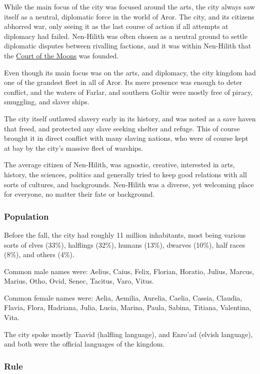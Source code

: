 While the main focus of the city was focused around the arts, the city always
saw itself as a neutral, diplomatic force in the world of Aror. The city, and
its citizens abhorred war, only seeing it as the last course of action if all
attempts at diplomacy had failed. Nen-Hilith was often chosen as a neutral
ground to settle diplomatic disputes between rivalling factions, and it was
within Nen-Hilith that the \hyperref[sec:Two Courts]{Court of the Moons} was
founded.

Even though its main focus was on the arts, and diplomacy, the city kingdom
had one of the grandest fleet in all of Aror. Its mere presence was enough to
deter conflict, and the waters of Farlar, and southern Goltir were mostly free
of piracy, smuggling, and slaver ships.

The city itself outlawed slavery early in its history, and was noted as a save
haven that freed, and protected any slave seeking shelter and refuge. This of
course brought it in direct conflict with many slaving nations, who were of
course kept at bay by the city's massive fleet of warships.

The average citizen of Nen-Hilith, was agnostic, creative, interested in arts,
history, the sciences, politics and generally tried to keep good relations with
all sorts of cultures, and backgrounds. Nen-Hilith was a diverse, yet welcoming
place for everyone, no matter their fate or background.

\subsubsection{Population}

Before the fall, the city had roughly 11 million inhabitants, most being
various sorts of elves (33\%), halflings (32\%), humans (13\%), dwarves
(10\%), half races (8\%), and others (4\%).

Common male names were: Aelius, Caius, Felix, Florian, Horatio, Julius, Marcus,
Marius, Otho, Ovid, Senec, Tacitus, Varo, Vitus.

Common female names were: Aelia, Aemilia, Aurelia, Caelia, Cassia, Claudia,
Flavia, Flora, Hadriana, Julia, Lucia, Marina, Paula, Sabina, Titiana,
Valentina, Vita.

The city spoke mostly Taavid (halfling language), and Enro'ad (elvish language),
and both were the official languages of the kingdom.

\subsubsection{Rule}

